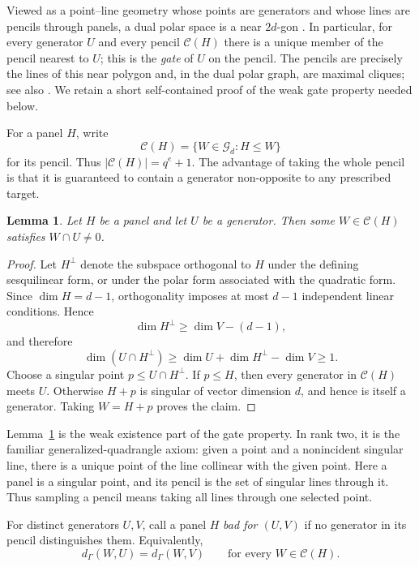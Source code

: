 \documentclass[11pt]{article}
\newtheorem{lemma}[theorem]{Lemma}
\theoremstyle{definition}
\theoremstyle{remark}
\begin{document}
Viewed as a point--line geometry whose points are generators and whose 
lines
are pencils through panels, a dual polar space is a near $2d$-gon
\cite{ShultYanushka,CameronDualPolar}.  In particular, for every generator
$U$ and every pencil $\mathcal C(H)$ there is a unique member of the 
pencil
nearest to $U$; this is the \emph{gate} of $U$ on the pencil.  The pencils
are precisely the lines of this near polygon and, in the dual polar graph,
are maximal cliques; see also \cite[Sec.~9.4]{BCN}.  We retain a short
self-contained proof of the weak gate property needed below.

For a panel $H$, write
\[
        \mathcal C(H)=\{W\in\mathcal G_d:H\leq W\}
\]
for its pencil.  Thus $|\mathcal C(H)|=q^e+1$.  The advantage of taking 
the
whole pencil is that it is guaranteed to contain a generator non-opposite 
to
any prescribed target.

\begin{lemma}\label{lem:dual-pencil-meets}
Let $H$ be a panel and let $U$ be a generator.  Then some
$W\in\mathcal C(H)$ satisfies $W\cap U\neq0$.
\end{lemma}

\begin{proof}
Let $H^\perp$ denote the subspace orthogonal to $H$ under the defining
sesquilinear form, or under the polar form associated with the quadratic
form.  Since $\dim H=d-1$, orthogonality imposes at most $d-1$ independent
linear conditions.  Hence
\[
        \dim H^\perp\geq \dim V-(d-1),
\]
and therefore
\[
        \dim(U\cap H^\perp)
        \geq \dim U+\dim H^\perp-\dim V
        \geq1.
\]
Choose a singular point $p\leq U\cap H^\perp$.  If $p\leq H$, then every
generator in $\mathcal C(H)$ meets $U$.  Otherwise $H+p$ is singular of
vector dimension $d$, and hence is itself a generator.  Taking
$W=H+p$ proves the claim.
\end{proof}

Lemma~\ref{lem:dual-pencil-meets} is the weak existence part of the gate
property.  In rank two, it is the familiar generalized-quadrangle axiom:
given a point and a nonincident singular line, there is a unique point of
the line collinear with the given point.  Here a panel is a singular point,
and its pencil is the set of singular lines through it.  Thus sampling a
pencil means taking all lines through one selected point.

For distinct generators $U,V$, call a panel $H$ \emph{bad for $(U,V)$} if
no generator in its pencil distinguishes them.  Equivalently,
\[
        d_\Gamma(W,U)=d_\Gamma(W,V)
        \qquad\text{for every }W\in\mathcal C(H).
\]
\end{document}
